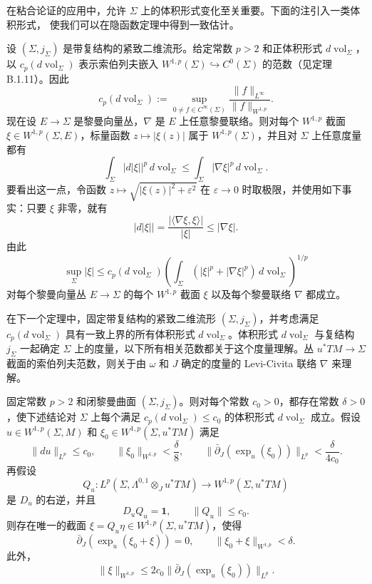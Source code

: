 在粘合论证的应用中，允许 $\Sigma$ 上的体积形式变化至关重要。下面的注引入一类体积形式，
使我们可以在隐函数定理中得到一致估计。

\begin{remark}\label{rem:3-5-1}
设 $(\Sigma,j_\Sigma)$ 是带复结构的紧致二维流形。给定常数 $p>2$ 和正体积形式
$d\operatorname{vol}_\Sigma$，以 $c_p(d\operatorname{vol}_\Sigma)$ 表示索伯列夫嵌入
$W^{1,p}(\Sigma)\hookrightarrow C^0(\Sigma)$ 的范数（见定理 B.1.11）。因此
\[
  c_p(d\operatorname{vol}_\Sigma)
  :=\sup_{0\ne f\in C^\infty(\Sigma)}
  \frac{\lVert f\rVert_{L^\infty}}
       {\lVert f\rVert_{W^{1,p}}}.
\]
现在设 $E\to\Sigma$ 是黎曼向量丛，$\nabla$ 是 $E$ 上任意黎曼联络。则对每个
$W^{1,p}$ 截面 $\xi\in W^{1,p}(\Sigma,E)$，标量函数 $z\mapsto|\xi(z)|$ 属于
$W^{1,p}(\Sigma)$，并且对 $\Sigma$ 上任意度量都有
\[
  \int_\Sigma|d|\xi||^p\,d\operatorname{vol}_\Sigma
  \le
  \int_\Sigma|\nabla\xi|^p\,d\operatorname{vol}_\Sigma.
\]
要看出这一点，令函数 $z\mapsto\sqrt{|\xi(z)|^2+\varepsilon^2}$ 在
$\varepsilon\to0$ 时取极限，并使用如下事实：只要 $\xi$ 非零，就有
\[
  |d|\xi||=\frac{|\langle\nabla\xi,\xi\rangle|}{|\xi|}
  \le|\nabla\xi|.
\]
由此
\[
  \sup_\Sigma|\xi|
  \le c_p(d\operatorname{vol}_\Sigma)
  \left(\int_\Sigma(|\xi|^p+|\nabla\xi|^p)\,
  d\operatorname{vol}_\Sigma\right)^{1/p}
\]
对每个黎曼向量丛 $E\to\Sigma$ 的每个 $W^{1,p}$ 截面 $\xi$ 以及每个黎曼联络
$\nabla$ 都成立。
\end{remark}

在下一个定理中，固定带复结构的紧致二维流形 $(\Sigma,j_\Sigma)$，并考虑满足
$c_p(d\operatorname{vol}_\Sigma)$ 具有一致上界的所有体积形式
$d\operatorname{vol}_\Sigma$。体积形式 $d\operatorname{vol}_\Sigma$ 与复结构
$j_\Sigma$ 一起确定 $\Sigma$ 上的度量，以下所有相关范数都关于这个度量理解。丛
$u^*TM\to\Sigma$ 截面的索伯列夫范数，则关于由 $\omega$ 和 $J$ 确定的度量的
Levi-Civita 联络 $\nabla$ 来理解。

\begin{theorem}\label{thm:3-5-2}
固定常数 $p>2$ 和闭黎曼曲面 $(\Sigma,j_\Sigma)$。则对每个常数 $c_0>0$，都存在常数
$\delta>0$，使下述结论对 $\Sigma$ 上每个满足
$c_p(d\operatorname{vol}_\Sigma)\le c_0$ 的体积形式
$d\operatorname{vol}_\Sigma$ 成立。假设
$u\in W^{1,p}(\Sigma,M)$ 和 $\xi_0\in W^{1,p}(\Sigma,u^*TM)$ 满足
\[
  \lVert du\rVert_{L^p}\le c_0,\qquad
  \lVert\xi_0\rVert_{W^{1,p}}<\frac\delta8,\qquad
  \bigl\lVert\bar\partial_J(\exp_u(\xi_0))\bigr\rVert_{L^p}
  <\frac\delta{4c_0}.
\]
再假设
\[
  Q_u:L^p(\Sigma,\Lambda^{0,1}\otimes_Ju^*TM)
  \longrightarrow W^{1,p}(\Sigma,u^*TM)
\]
是 $D_u$ 的右逆，并且
\[
  D_uQ_u=\mathbf1,\qquad \lVert Q_u\rVert\le c_0.
\]
则存在唯一的截面 $\xi=Q_u\eta\in W^{1,p}(\Sigma,u^*TM)$，使得
\[
  \bar\partial_J(\exp_u(\xi_0+\xi))=0,\qquad
  \lVert\xi_0+\xi\rVert_{W^{1,p}}<\delta.
\]
此外，
\[
  \lVert\xi\rVert_{W^{1,p}}
  \le2c_0\bigl\lVert\bar\partial_J(\exp_u(\xi_0))\bigr\rVert_{L^p}.
\]
\end{theorem}

